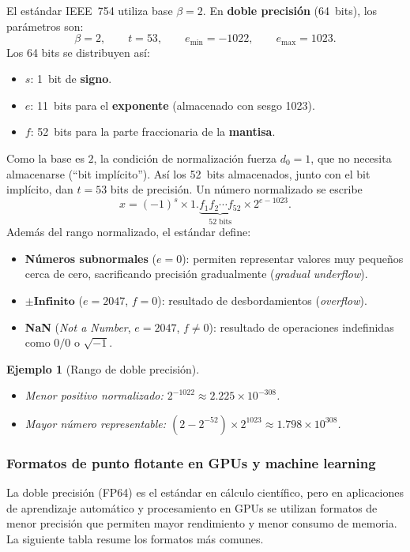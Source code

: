 \documentclass[a4paper,11pt]{report}
\newtheorem{example}[theorem]{Ejemplo}
\begin{document}
El estándar IEEE~754 utiliza base $\beta = 2$. En \textbf{doble precisión} (64~bits), los parámetros son:
\[
\beta = 2,\qquad t = 53,\qquad e_{\min} = -1022,\qquad e_{\max} = 1023.
\]
Los 64 bits se distribuyen así:
\begin{itemize}
\item $s$: 1~bit de \textbf{signo}.
\item $e$: 11~bits para el \textbf{exponente} (almacenado con sesgo 1023).
\item $f$: 52~bits para la parte fraccionaria de la \textbf{mantisa}.
\end{itemize}
Como la base es $2$, la condición de normalización fuerza $d_0=1$, que no necesita almacenarse (``bit implícito''). Así los 52~bits almacenados, junto con el bit implícito, dan $t=53$ bits de precisión.  Un número normalizado se escribe
\[
x = (-1)^s \times 1.\underbrace{f_1 f_2\cdots f_{52}}_{52\text{ bits}} \times 2^{e-1023}.
\]
Además del rango normalizado, el estándar define:
\begin{itemize}
\item \textbf{Números subnormales} ($e=0$): permiten representar valores muy pequeños cerca de cero, sacrificando precisión gradualmente (\textit{gradual underflow}).
\item $\pm\textbf{Infinito}$ ($e=2047$, $f=0$): resultado de desbordamientos (\textit{overflow}).
\item \textbf{NaN} (\textit{Not a Number}, $e=2047$, $f\neq 0$): resultado de operaciones indefinidas como $0/0$ o $\sqrt{-1}$.
\end{itemize}

\begin{example}[Rango de doble precisión]
\begin{itemize}
\item Menor positivo normalizado: $2^{-1022} \approx 2.225 \times 10^{-308}$.
\item Mayor número representable: $(2-2^{-52})\times 2^{1023} \approx 1.798 \times 10^{308}$.
\end{itemize}
\end{example}

\subsubsection*{Formatos de punto flotante en GPUs y machine learning}

La doble precisión (FP64) es el estándar en cálculo científico, pero en aplicaciones de aprendizaje automático y procesamiento en GPUs se utilizan formatos de menor precisión que permiten mayor rendimiento y menor consumo de memoria.  La siguiente tabla resume los formatos más comunes.
\end{document}
